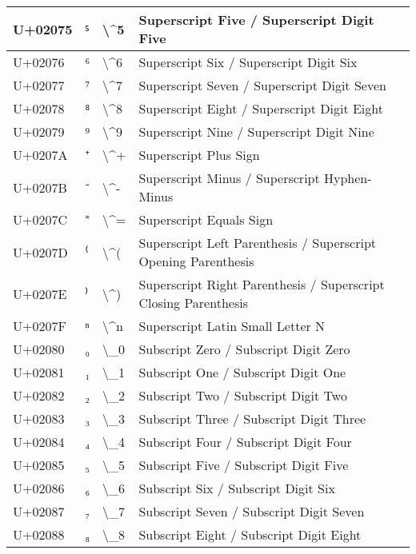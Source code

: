 \begin{table}[h]
\begin{tabulary}{\linewidth}{|L|L|L|L|}
\hline
U+02075 & ⁵ & {\textbackslash}{\textasciicircum}5 & Superscript Five / Superscript Digit Five \\
\hline
U+02076 & ⁶ & {\textbackslash}{\textasciicircum}6 & Superscript Six / Superscript Digit Six \\
\hline
U+02077 & ⁷ & {\textbackslash}{\textasciicircum}7 & Superscript Seven / Superscript Digit Seven \\
\hline
U+02078 & ⁸ & {\textbackslash}{\textasciicircum}8 & Superscript Eight / Superscript Digit Eight \\
\hline
U+02079 & ⁹ & {\textbackslash}{\textasciicircum}9 & Superscript Nine / Superscript Digit Nine \\
\hline
U+0207A & ⁺ & {\textbackslash}{\textasciicircum}+ & Superscript Plus Sign \\
\hline
U+0207B & ⁻ & {\textbackslash}{\textasciicircum}- & Superscript Minus / Superscript Hyphen-Minus \\
\hline
U+0207C & ⁼ & {\textbackslash}{\textasciicircum}= & Superscript Equals Sign \\
\hline
U+0207D & ⁽ & {\textbackslash}{\textasciicircum}( & Superscript Left Parenthesis / Superscript Opening Parenthesis \\
\hline
U+0207E & ⁾ & {\textbackslash}{\textasciicircum}) & Superscript Right Parenthesis / Superscript Closing Parenthesis \\
\hline
U+0207F & ⁿ & {\textbackslash}{\textasciicircum}n & Superscript Latin Small Letter N \\
\hline
U+02080 & ₀ & {\textbackslash}\_0 & Subscript Zero / Subscript Digit Zero \\
\hline
U+02081 & ₁ & {\textbackslash}\_1 & Subscript One / Subscript Digit One \\
\hline
U+02082 & ₂ & {\textbackslash}\_2 & Subscript Two / Subscript Digit Two \\
\hline
U+02083 & ₃ & {\textbackslash}\_3 & Subscript Three / Subscript Digit Three \\
\hline
U+02084 & ₄ & {\textbackslash}\_4 & Subscript Four / Subscript Digit Four \\
\hline
U+02085 & ₅ & {\textbackslash}\_5 & Subscript Five / Subscript Digit Five \\
\hline
U+02086 & ₆ & {\textbackslash}\_6 & Subscript Six / Subscript Digit Six \\
\hline
U+02087 & ₇ & {\textbackslash}\_7 & Subscript Seven / Subscript Digit Seven \\
\hline
U+02088 & ₈ & {\textbackslash}\_8 & Subscript Eight / Subscript Digit Eight \\

\end{tabulary}
\end{table}

